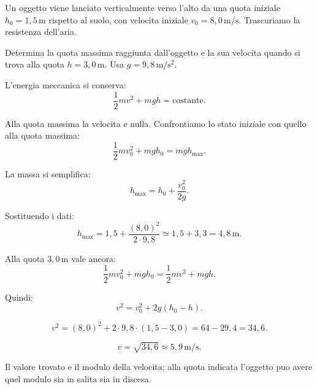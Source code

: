 
\begin{esercizio}
Un oggetto viene lanciato verticalmente verso l'alto da una quota iniziale
\(h_0=1{,}5\,\mathrm{m}\) rispetto al suolo, con velocita iniziale
\(v_0=8{,}0\,\mathrm{m/s}\). Trascuriamo la resistenza dell'aria.

Determina la quota massima raggiunta dall'oggetto e la sua velocita quando
si trova alla quota \(h=3{,}0\,\mathrm{m}\). Usa
\(g=9{,}8\,\mathrm{m/s^2}\).
\end{esercizio}

\begin{soluzione}
L'energia meccanica si conserva:
\[
\frac{1}{2}mv^2+mgh=\text{costante}.
\]

Alla quota massima la velocita e nulla. Confrontiamo lo stato iniziale con
quello alla quota massima:
\[
\frac{1}{2}mv_0^2+mgh_0=mgh_\text{max}.
\]

La massa si semplifica:
\[
h_\text{max}=h_0+\frac{v_0^2}{2g}.
\]

Sostituendo i dati:
\[
h_\text{max}=1{,}5+\frac{(8{,}0)^2}{2\cdot 9{,}8}
\simeq 1{,}5+3{,}3
=4{,}8\,\mathrm{m}.
\]

Alla quota \(3{,}0\,\mathrm{m}\) vale ancora:
\[
\frac{1}{2}mv_0^2+mgh_0=\frac{1}{2}mv^2+mgh.
\]

Quindi:
\[
v^2=v_0^2+2g(h_0-h).
\]

\[
v^2=(8{,}0)^2+2\cdot 9{,}8\cdot (1{,}5-3{,}0)
=64-29{,}4=34{,}6.
\]

\[
v=\sqrt{34{,}6}\simeq 5{,}9\,\mathrm{m/s}.
\]

Il valore trovato e il modulo della velocita; alla quota indicata l'oggetto
puo avere quel modulo sia in salita sia in discesa.
\end{soluzione}
